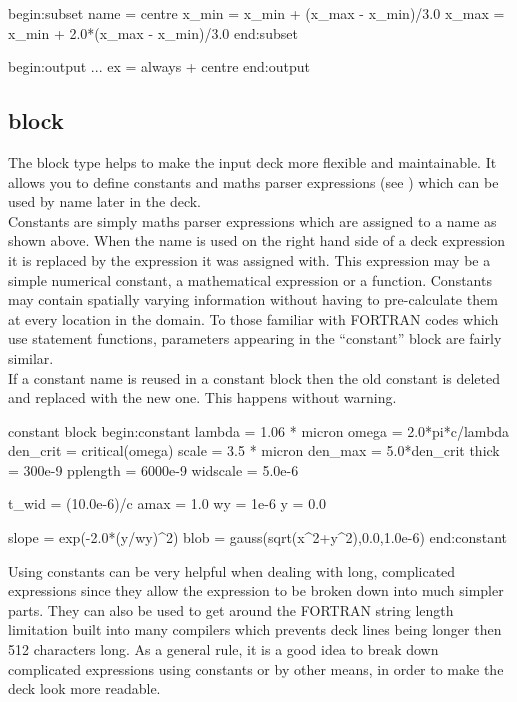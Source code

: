 \begin{boxverbatim}
begin:subset
   name = centre
   x_min = x_min + (x_max - x_min)/3.0
   x_max = x_min + 2.0*(x_max - x_min)/3.0
end:subset

begin:output
   ...
   ex = always + centre
end:output
\end{boxverbatim}

\subsection{\texorpdfstring
  { block}
  {           {constant} block}}
\label{sec:constant_block}

The  block type helps to make the input deck more flexible
and maintainable. It allows you to define constants and maths parser
expressions (see ) which can be used by name later in the
deck.\\

Constants are simply maths parser expressions which are assigned to a name as
shown above. When the name is used on the right hand side of a deck expression
it is replaced by the expression it was assigned with. This expression may
be a simple numerical constant, a mathematical expression or a function.
Constants may contain spatially varying information without having to
pre-calculate them at every location in the domain.
To those familiar with FORTRAN codes which use statement functions, parameters
appearing in the ``constant'' block are fairly similar.\\

If a constant name is reused in a constant block then the old constant is
deleted and replaced with the new one. This happens without warning.
\begin{lboxverbatim}{constant block}
begin:constant
   lambda = 1.06 * micron
   omega = 2.0*pi*c/lambda
   den_crit = critical(omega)
   scale = 3.5 * micron
   den_max = 5.0*den_crit
   thick = 300e-9
   pplength = 6000e-9
   widscale = 5.0e-6

   t_wid = (10.0e-6)/c
   amax = 1.0
   wy = 1e-6
   y = 0.0

   slope = exp(-2.0*(y/wy)^2)
   blob = gauss(sqrt(x^2+y^2),0.0,1.0e-6)
end:constant
\end{lboxverbatim}

Using constants can be very helpful when dealing with long,
complicated expressions since they allow the expression to be broken down into
much simpler parts. They can also be used to get around the FORTRAN string
length limitation built into many compilers which prevents deck lines being
longer then 512 characters long. As a general rule, it is a good idea to break
down complicated expressions using constants or by other means, in order to
make the deck look more readable.\\

